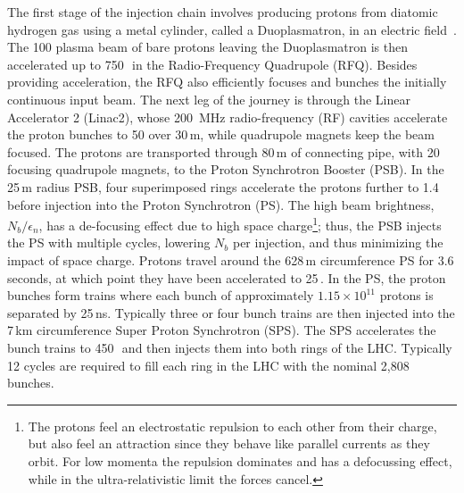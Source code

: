 The first stage of the injection chain involves producing protons from diatomic hydrogen gas using a metal cylinder, called a Duoplasmatron, in an electric field~\cite{lhc_closer_look}. 
The 100\,\keV\,plasma beam of bare protons leaving the Duoplasmatron is then accelerated up to 750\,\keV\, in the Radio-Frequency Quadrupole (RFQ).
Besides providing acceleration, the RFQ also efficiently focuses and bunches the initially continuous input beam. The next leg of the journey is through the Linear Accelerator 2 (Linac2), whose 200 \,MHz radio-frequency (RF) cavities accelerate the proton bunches to 50\,\MeV\,over 30\,m, while quadrupole magnets keep the beam focused. The protons are transported through 80\,m of connecting pipe, with 20 focusing quadrupole magnets, to the Proton Synchrotron Booster (PSB). In the 25\,m radius PSB, four superimposed rings accelerate the protons further to 1.4\,\GeV\,before injection into the Proton Synchrotron (PS). The high beam brightness, $N_b/\epsilon_n$, has a de-focusing effect due to high space charge\footnote{
	The protons feel an electrostatic repulsion to each other from their charge, but also feel an attraction since they behave like parallel currents as they orbit. For low momenta the repulsion dominates and has a defocussing effect, while in the ultra-relativistic limit the forces cancel.
}; thus, the PSB injects the PS with multiple cycles, lowering $N_b$ per injection, and thus minimizing the impact of space charge. Protons travel around the 628\,m circumference PS for 3.6 seconds, at which point they have been accelerated to 25\,\GeV. In the PS, the proton bunches form trains where each bunch of approximately $1.15\times10^{11}$ protons is separated by 25\,ns. Typically three or four bunch trains are then injected into the 7\,km circumference Super Proton Synchrotron (SPS). The SPS accelerates the bunch trains to 450\,\GeV\, and then injects them into both rings of the LHC. Typically 12 cycles are required to fill each ring in the LHC with the nominal 2,808 bunches. 
